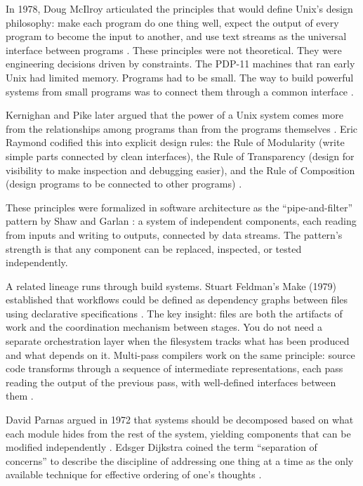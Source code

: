 \documentclass[acmlarge,nonacm,screen]{acmart}
\begin{document}
In 1978, Doug McIlroy articulated the principles that would define Unix's design philosophy: make each program do one thing well, expect the output of every program to become the input to another, and use text streams as the universal interface between programs \cite{mcilroy1978}. These principles were not theoretical. They were engineering decisions driven by constraints. The PDP-11 machines that ran early Unix had limited memory. Programs had to be small. The way to build powerful systems from small programs was to connect them through a common interface \cite{ritchie1974}.

Kernighan and Pike later argued that the power of a Unix system comes more from the relationships among programs than from the programs themselves \cite{kernighan1984}. Eric Raymond codified this into explicit design rules: the Rule of Modularity (write simple parts connected by clean interfaces), the Rule of Transparency (design for visibility to make inspection and debugging easier), and the Rule of Composition (design programs to be connected to other programs) \cite{raymond2003}.

These principles were formalized in software architecture as the ``pipe-and-filter'' pattern by Shaw and Garlan \cite{shaw1996}: a system of independent components, each reading from inputs and writing to outputs, connected by data streams. The pattern's strength is that any component can be replaced, inspected, or tested independently.

A related lineage runs through build systems. Stuart Feldman's Make (1979) established that workflows could be defined as dependency graphs between files using declarative specifications \cite{feldman1979}. The key insight: files are both the artifacts of work and the coordination mechanism between stages. You do not need a separate orchestration layer when the filesystem tracks what has been produced and what depends on it. Multi-pass compilers work on the same principle: source code transforms through a sequence of intermediate representations, each pass reading the output of the previous pass, with well-defined interfaces between them \cite{aho2006}.

David Parnas argued in 1972 that systems should be decomposed based on what each module hides from the rest of the system, yielding components that can be modified independently \cite{parnas1972}. Edsger Dijkstra coined the term ``separation of concerns'' to describe the discipline of addressing one thing at a time as the only available technique for effective ordering of one's thoughts \cite{dijkstra1974}.
\end{document}

